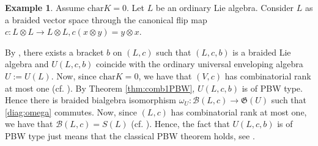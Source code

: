 \documentclass[english]{amsart}
\numberwithin{equation}{section}
\numberwithin{figure}{section}
\theoremstyle{plain}
\theoremstyle{definition}
\theoremstyle{definition}
\newtheorem{example}[thm]{Example}
\theoremstyle{remark}
\theoremstyle{remark}
\theoremstyle{plain}
\theoremstyle{plain}
\theoremstyle{plain}
\begin{document}
\begin{example}
\label{ex:ClassicLie}Assume $\mathrm{char}K=0$. Let $L$ be an
ordinary Lie algebra. Consider $L$ as a braided vector space through
the canonical flip map $c:L\otimes L\rightarrow L\otimes L,c(x\otimes y)=y\otimes x$. 

By \cite[Example 6.10]{Ardizzoni-MMPrim}, there exists a bracket
$b$ on $(L,c)$ such that $\left(L,c,b\right)$ is a braided Lie
algebra and $U(L,c,b)$ coincide with the ordinary universal enveloping
algebra $U:=U(L)$. Now, since $\mathrm{char}K=0$, we have that $\left(V,c\right)$
has combinatorial rank at most one (cf. \cite[Theorem 6.13]{Ardizzoni-Sdeg}).
By Theorem \ref{thm:comb1PBW}, $U(L,c,b)$ is of PBW type. Hence
there is braided bialgebra isomorphism $\omega_{U}:\mathcal{B}\left(L,c\right)\rightarrow\mathfrak{G}\left(U\right)$
such that \eqref{diag:omega} commutes. Now, since $\left(L,c\right)$
has combinatorial rank at most one, we have that $\mathcal{B}\left(L,c\right)=S(L)$
(cf. \cite[Remark 6.14]{Ardizzoni-SFFS}). Hence, the fact that $U(L,c,b)$
is of PBW type just means that the classical PBW theorem holds, see
\cite[page 92]{Humphreys}. \end{example}
\end{document}
